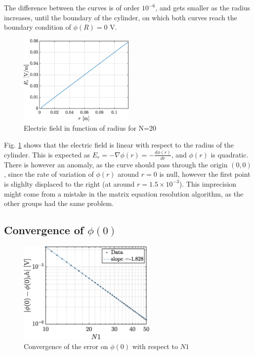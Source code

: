 \documentclass[a4paper,12pt,twoside]{article}
\newcommand{\grad}[1]{\nabla#1}
\begin{document}
  The difference between the curves is of order $10^{-6}$, and gets smaller as the radius increases, until the boundary of the cylinder, on which both curves reach the boundary condition of $\phi(R)=0$ V.

  \begin{figure}[h!]
   \centering
   \includegraphics[width=0.5\textwidth]{graphs/c_Er.eps}
   \caption{Electric field in function of radius for N=20}
   \label{cEr}
  \end{figure}

  Fig. \ref{cEr} shows that the electric field is linear with respect to the radius of the cylinder.
  This is expected as $E_r = -\grad{\phi(r)} = -\frac{d\phi(r)}{dr}$, and $\phi(r)$ is quadratic.
  There is however an anomaly, as the curve should pass through the origin $(0,0)$, since the rate of variation of $\phi(r)$ around $r=0$ is null, however the first point is slighlty displaced to the right (at around $r=1.5\times 10^{-3}$).
  This imprecision might come from a mistake in the matrix equation resolution algorithm, as the other groups had the same problem.

  \subsection{Convergence of $\phi(0)$}

  \begin{figure}[h]
   \centering
   \includegraphics[width=0.6\textwidth]{graphs/c_convphi.eps}
   \caption{Convergence of the error on $\phi(0)$ with respect to $N1$}
   \label{cconv}
  \end{figure}
\end{document}
